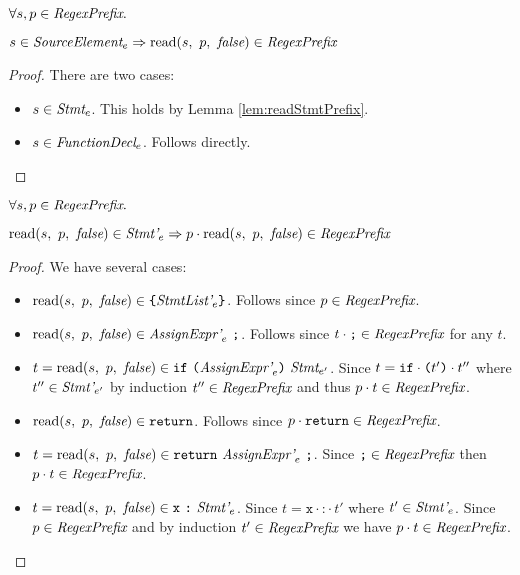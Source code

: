 \documentclass[onecolumn]{sigplanconf-onecolumn}
\begin{document}
\begin{lemma}\mbox{}
  
  \( \forall s, p \in \textit{RegexPrefix}. \)

  \( 
  s \in \textit{SourceElement}_{e} \Rightarrow 
  \textrm{read}(s,~p,~\textit{false}) \in \textit{RegexPrefix}
  \)
\end{lemma}
\begin{proof}
  There are two cases:
  \begin{itemize}
  \item \( s \in \textit{Stmt}_{e} \). This holds by
    Lemma \ref{lem:readStmtPrefix}.

  \item \( s \in \textit{FunctionDecl}_{e} \). Follows directly.
  \end{itemize}
\end{proof}

\begin{lemma}\mbox{}

  \( \forall s, p \in \textit{RegexPrefix}. \)

  \( \textrm{read}(s,~p,~\textit{false}) \in \textit{Stmt'}_{e} \Rightarrow p \cdot \textrm{read}(s,~p,~\textit{false}) \in \textit{RegexPrefix} \)
\end{lemma}
\begin{proof}
  We have several cases:
  \begin{itemize}
  \item \( \textrm{read}(s,~p,~\textit{false}) \in \texttt{\{}\textit{StmtList'}_{e}\texttt{\}}
    \). Follows since \( p \in \textit{RegexPrefix} \).

  \item \( \textrm{read}(s,~p,~\textit{false}) \in \textit{AssignExpr'}_{e}~\texttt{;}
    \). Follows since \( t \cdot \texttt{;} \in \textit{RegexPrefix} \) for any
    \( t \).
    
  \item \( t = \textrm{read}(s,~p,~\textit{false}) \in \texttt{if}~\texttt{(}\textit{AssignExpr'}_{e}\texttt{)}~\textit{Stmt}_{e'} \). Since
    \( t = \texttt{if}\cdot \texttt{(}t'\texttt{)}\cdot t'' \) where \( t'' \in
    \textit{Stmt'}_{e'} \) by induction \( t'' \in \textit{RegexPrefix} \) and
    thus \( p \cdot t \in \textit{RegexPrefix} \).

  \item \( \textrm{read}(s,~p,~\textit{false}) \in \texttt{return} \).
    Follows since \( p \cdot \texttt{return} \in \textit{RegexPrefix} \).
    
  \item \( t = \textrm{read}(s,~p,~\textit{false}) \in
    \texttt{return}~\textit{AssignExpr'}_{e}~ \texttt{;} \). 
    Since \( \texttt{;} \in \textit{RegexPrefix} \) then \( p \cdot t \in
    \textit{RegexPrefix} \).

  \item \( t = \textrm{read}(s,~p,~\textit{false}) \in
    \texttt{x}~\texttt{:}~\textit{Stmt'}_{e} \). Since \( t = \texttt{x}\cdot
    \texttt{:}\cdot t' \) where \( t' \in \textit{Stmt'}_{e} \). Since
    \( p \in \textit{RegexPrefix} \) and by induction \( t' \in \textit{RegexPrefix} \) we
    have \( p \cdot t \in \textit{RegexPrefix} \).

  \end{itemize}
\end{proof}
\end{document}

